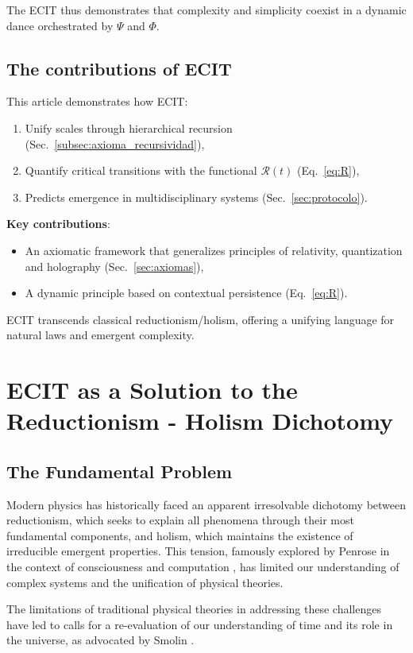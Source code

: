 \documentclass{article}
\begin{document}
The ECIT thus demonstrates that complexity and simplicity coexist in a dynamic dance orchestrated by $\Psi$ and $\Phi$.

\subsection{The contributions of ECIT}
This article demonstrates how ECIT: 
\begin{enumerate}
    \item Unify scales through hierarchical recursion (Sec.~\ref{subsec:axioma_recursividad}),
    \item Quantify critical transitions with the functional $\mathcal{R}(t)$ (Eq.~\ref{eq:R}),
    \item Predicts emergence in multidisciplinary systems (Sec.~\ref{sec:protocolo}).
\end{enumerate}

\noindent\textbf{Key contributions}:  
\begin{itemize}
    \item An axiomatic framework that generalizes principles of relativity, quantization and holography (Sec.~\ref{sec:axiomas}),
    \item A dynamic principle based on contextual persistence (Eq.~\ref{eq:R}).
\end{itemize}

ECIT transcends classical reductionism/holism, offering a unifying language for natural laws and emergent complexity.

\section{ECIT as a Solution to the Reductionism - Holism Dichotomy}

\subsection{The Fundamental Problem}
Modern physics has historically faced an apparent irresolvable dichotomy between reductionism, which seeks to explain all phenomena through their most fundamental components, and holism, which maintains the existence of irreducible emergent properties. This tension, famously explored by Penrose in the context of consciousness and computation \cite{Penrose1989}, has limited our understanding of complex systems and the unification of physical theories.\bigskip

\noindent The limitations of traditional physical theories in addressing these challenges have led to calls for a re-evaluation of our understanding of time and its role in the universe, as advocated by Smolin \cite{Smolin2013}.
\end{document}
